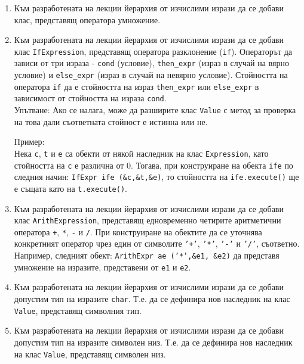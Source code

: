 \documentclass[12pt,a4paper]{article}
\newcommand{\code}[1]{\texttt{#1}}
\begin{document}
\begin{enumerate}
	\item Към разработената на лекции йерархия от изчислими изрази да се добави клас, представящ оператора умножение.

	\item Към разработената на лекции йерархия от изчислими изрази да се добави клас \code{IfExpression}, представящ оператора разклонение (\code{if}). Операторът да зависи от три израза - \code{cond} (условие), \code{then\_expr} (израз в случай на вярно условие) и \code{else\_expr} (израз в случай на невярно условие). Стойността на оператора \code{if} да е стойността на израз \code{then\_expr} или \code{else\_expr} в зависимост от стойността на израза \code{cond}.\\

	Упътване: Ако се налага, може да разширите клас \code{Value} с метод за проверка на това дали съответната стойност е истинна или не.


	\begin{mdframed}[hidealllines=true,backgroundcolor=gray!20]
	Пример:\\
	
	Нека \code{c}, \code{t} и \code {e} са обекти от някой наследник на клас \code {Expression}, като стойността на \code{c} е различна от 0. Тогава, при конструиране на обекта \code{ife} по следния начин: \code{IfExpr ife (\&c,\&t,\&e)}, то стойността на \code{ife.execute()} ще е същата като на \code{t.execute()}.
 
	\end{mdframed}

	\item Към разработената на лекции йерархия от изчислими изрази да се добави клас \code{ArithExpression}, представящ едновременно четирите аритметични оператора \code{+}, \code{*}, \code{-} и \code{/}. При конструиране на обектите да се уточнява конкретният оператор чрез един от символите \code{'+'}, \code{'*'}, \code{'-'} и \code{'/'}, съответно. Например, следният обект: \code{ArithExpr ae ('*',\&e1, \&e2)} да представя умножение на изразите, представени от \code{e1} и \code{e2}.

	\item Към разработената на лекции йерархия от изчислими изрази да се добави допустим тип на изразите \code{char}. Т.е. да се дефинира нов наследник на клас \code{Value}, представящ символния тип. 

	\item Към разработената на лекции йерархия от изчислими изрази да се добави допустим тип на изразите символен низ. Т.е. да се дефинира нов наследник на клас \code{Value}, представящ символен низ. 


\end{enumerate}







	\vspace{20px}
\end{document}
